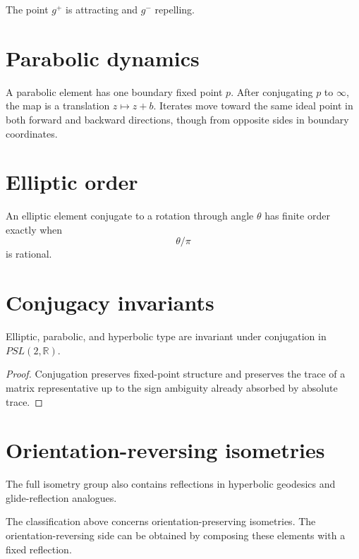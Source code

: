 The point \(g^+\) is attracting and \(g^-\) repelling.

\section{Parabolic dynamics}

A parabolic element has one boundary fixed point \(p\).  After conjugating
\(p\) to \(\infty\), the map is a translation \(z\mapsto z+b\).  Iterates move
toward the same ideal point in both forward and backward directions, though from
opposite sides in boundary coordinates.

\section{Elliptic order}

\begin{proposition}\label{prop:vii34-elliptic-order}
An elliptic element conjugate to a rotation through angle \(\theta\) has finite
order exactly when
\[
\theta/\pi
\]
is rational.
\end{proposition}

\section{Conjugacy invariants}

\begin{proposition}\label{prop:vii34-conjugacy}
Elliptic, parabolic, and hyperbolic type are invariant under conjugation in
\(PSL(2,\mathbb R)\).
\end{proposition}

\begin{proof}
Conjugation preserves fixed-point structure and preserves the trace of a matrix
representative up to the sign ambiguity already absorbed by absolute trace.
\end{proof}

\section{Orientation-reversing isometries}

The full isometry group also contains reflections in hyperbolic geodesics and
glide-reflection analogues.

\begin{remark}
The classification above concerns orientation-preserving isometries.  The
orientation-reversing side can be obtained by composing these elements with a
fixed reflection.
\end{remark}

